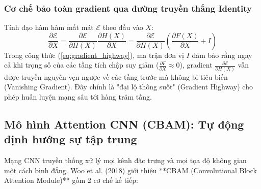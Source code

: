 \documentclass[12pt,a4paper]{article}
\begin{document}
\subsubsection{Cơ chế bảo toàn gradient qua đường truyền thẳng Identity}
Tính đạo hàm hàm mất mát $\mathcal{E}$ theo đầu vào $X$:
\begin{equation}
    \frac{\partial \mathcal{E}}{\partial X} = \frac{\partial \mathcal{E}}{\partial H(X)} \frac{\partial H(X)}{\partial X} = \frac{\partial \mathcal{E}}{\partial H(X)} \left( \frac{\partial F(X)}{\partial X} + I \right)
    \label{eq:gradient_highway}
\end{equation}
Trong công thức (\ref{eq:gradient_highway}), ma trận đơn vị $I$ đảm bảo rằng ngay cả khi trọng số của các tầng tích chập suy giảm ($\frac{\partial F}{\partial X} \approx 0$), gradient $\frac{\partial \mathcal{E}}{\partial H(X)}$ vẫn được truyền nguyên vẹn ngược về các tầng trước mà không bị tiêu biến (Vanishing Gradient). Đây chính là "đại lộ thông suốt" (Gradient Highway) cho phép huấn luyện mạng sâu tới hàng trăm tầng.

\newpage
\subsection{Mô hình Attention CNN (CBAM): Tự động định hướng sự tập trung}
Mạng CNN truyền thống xử lý mọi kênh đặc trưng và mọi tọa độ không gian một cách bình đẳng. Woo et al. (2018) giới thiệu **CBAM (Convolutional Block Attention Module)** gồm 2 cơ chế kế tiếp:
\end{document}
